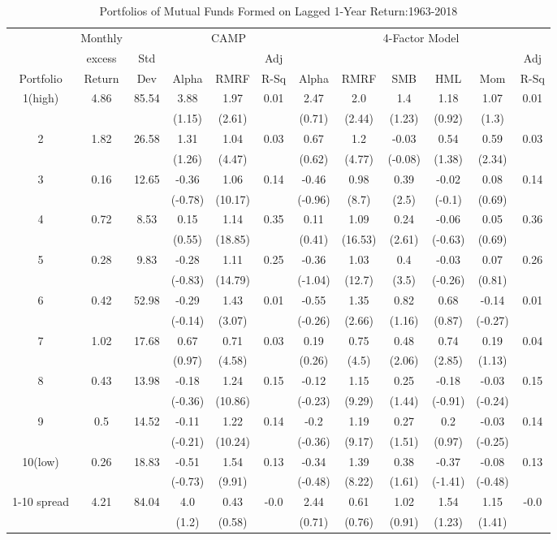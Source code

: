 \documentclass[a4paper]{article}
\begin{document}
    \begin{table}[h!]
        \centering
        \begin{tabular}{c cc ccc cccccc} 
        \toprule[1.5pt]
          &  Monthly &  & \multicolumn{3}{c}{CAMP} &  \multicolumn{6}{c}{4-Factor Model}\\
          & excess& Std &   &  & Adj &   &  &  &  &  & Adj\\
         Portfolio & Return & Dev & Alpha  & RMRF & R-Sq &  Alpha  & RMRF & SMB & HML & Mom &  R-Sq\\
        
        \toprule[1.5pt]
        1(high)&4.86&85.54&3.88&1.97&0.01&2.47&2.0&1.4&1.18&1.07&0.01\\
        &&&(1.15)&(2.61)&&(0.71)&(2.44)&(1.23)&(0.92)&(1.3)&\\
        2&1.82&26.58&1.31&1.04&0.03&0.67&1.2&-0.03&0.54&0.59&0.03\\
        &&&(1.26)&(4.47)&&(0.62)&(4.77)&(-0.08)&(1.38)&(2.34)&\\
        3&0.16&12.65&-0.36&1.06&0.14&-0.46&0.98&0.39&-0.02&0.08&0.14\\
        &&&(-0.78)&(10.17)&&(-0.96)&(8.7)&(2.5)&(-0.1)&(0.69)&\\
        4&0.72&8.53&0.15&1.14&0.35&0.11&1.09&0.24&-0.06&0.05&0.36\\
        &&&(0.55)&(18.85)&&(0.41)&(16.53)&(2.61)&(-0.63)&(0.69)&\\
        5&0.28&9.83&-0.28&1.11&0.25&-0.36&1.03&0.4&-0.03&0.07&0.26\\
        &&&(-0.83)&(14.79)&&(-1.04)&(12.7)&(3.5)&(-0.26)&(0.81)&\\
        6&0.42&52.98&-0.29&1.43&0.01&-0.55&1.35&0.82&0.68&-0.14&0.01\\
        &&&(-0.14)&(3.07)&&(-0.26)&(2.66)&(1.16)&(0.87)&(-0.27)&\\
        7&1.02&17.68&0.67&0.71&0.03&0.19&0.75&0.48&0.74&0.19&0.04\\
        &&&(0.97)&(4.58)&&(0.26)&(4.5)&(2.06)&(2.85)&(1.13)&\\
        8&0.43&13.98&-0.18&1.24&0.15&-0.12&1.15&0.25&-0.18&-0.03&0.15\\
        &&&(-0.36)&(10.86)&&(-0.23)&(9.29)&(1.44)&(-0.91)&(-0.24)&\\
        9&0.5&14.52&-0.11&1.22&0.14&-0.2&1.19&0.27&0.2&-0.03&0.14\\
        &&&(-0.21)&(10.24)&&(-0.36)&(9.17)&(1.51)&(0.97)&(-0.25)&\\
        10(low)&0.26&18.83&-0.51&1.54&0.13&-0.34&1.39&0.38&-0.37&-0.08&0.13\\
        &&&(-0.73)&(9.91)&&(-0.48)&(8.22)&(1.61)&(-1.41)&(-0.48)&\\
        1-10 spread&4.21&84.04&4.0&0.43&-0.0&2.44&0.61&1.02&1.54&1.15&-0.0\\
        &&&(1.2)&(0.58)&&(0.71)&(0.76)&(0.91)&(1.23)&(1.41)&\\
        
        \toprule[1.5pt]
        \end{tabular}
        \caption{Portfolios of Mutual Funds Formed on Lagged 1-Year Return:1963-2018}
        \label{table:1}
        \end{table}
\end{document}
